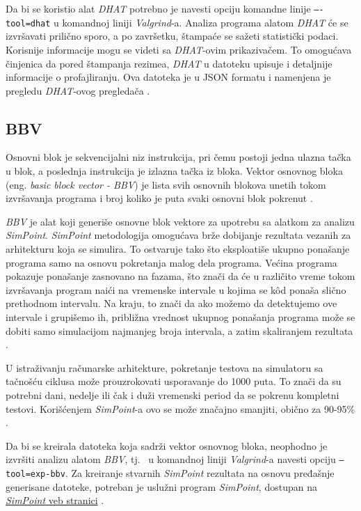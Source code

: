\documentclass[12pt,oneside]{memoir}
\theoremstyle{plain}
\theoremstyle{definition}
\begin{document}
Da bi se koristio alat \textit{ DHAT} potrebno je navesti opciju komandne linije \texttt{–-tool=dhat} u komandnoj liniji \textit{Valgrind}-a. Analiza programa alatom \textit{DHAT} će se izvršavati prilično sporo, a po završetku, štampaće se sažeti statistički podaci. Korisnije informacije mogu se videti sa \textit{DHAT}-ovim prikazivačem. To omogućava činjenica da pored štampanja rezimea, \textit{DHAT} u datoteku upisuje i detaljnije informacije o profajliranju. Ova datoteka je u JSON formatu i namenjena je pregledu \textit{DHAT}-ovog pregledača \cite{DHAT}. 

\subsection{BBV}

Osnovni blok je sekvencijalni niz instrukcija, pri čemu postoji jedna ulazna tačka u blok, a poslednja instrukcija je izlazna tačka iz bloka. Vektor osnovnog bloka (eng. \textit{basic block vector - BBV}) je lista svih osnovnih blokova unetih tokom izvršavanja programa i broj koliko je puta svaki osnovni blok pokrenut \cite{BBV}. 

\textit{BBV} je alat koji generiše osnovne blok vektore za upotrebu sa alatkom za analizu \textit{SimPoint}. \textit{SimPoint} metodologija omogućava brže dobijanje rezultata vezanih za arhitekturu koja se simulira. To ostvaruje tako što eksploatiše ukupno ponašanje programa samo na osnovu pokretanja malog dela programa. Većina programa pokazuje ponašanje zasnovano na fazama, što znači da će u različito vreme tokom izvršavanja program naići na vremenske intervale u kojima se k\^od ponaša slično prethodnom intervalu. Na kraju, to znači da ako možemo da detektujemo ove intervale i grupišemo ih, približna vrednost ukupnog ponašanja programa može se dobiti samo simulacijom najmanjeg broja intervala, a zatim skaliranjem rezultata \cite{BBV}.

U istraživanju računarske arhitekture, pokretanje testova na simulatoru sa tačnošću ciklusa može prouzrokovati usporavanje do 1000 puta. To znači da su potrebni dani, nedelje ili čak i duži vremenski period da se pokrenu kompletni testovi. Korišćenjem \textit{SimPoint}-a ovo se može značajno smanjiti, obično za 90-95\% \cite{BBV}.

Da bi se kreirala datoteka koja sadrži vektor osnovnog bloka, neophodno je izvršiti analizu alatom \textit{BBV}, tj.~ u komandnoj liniji \textit{Valgrind}-a navesti opciju \texttt{–tool=exp-bbv}. Za kreiranje stvarnih \textit{SimPoint} rezultata na osnovu pređašnje generisane datoteke, potreban je uslužni program \textit{SimPoint}, dostupan na \href{http://cseweb.ucsd.edu/~calder/simpoint/}{\textit{SimPoint} veb stranici} \cite{BBV}.  
\end{document}
